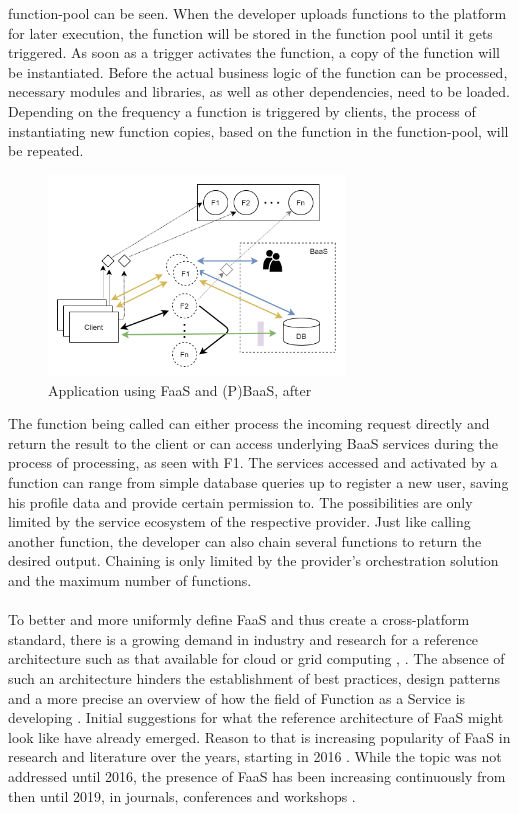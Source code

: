 \documentclass[a4paper,11pt, pagesize]{scrartcl}
\begin{document}
\begin{spacing}{1.2}
function-pool can be seen. When the developer uploads functions to the platform for later execution, the function will be stored in the function pool until it gets triggered. As soon as a trigger activates the function, a copy of the function will be instantiated. Before the actual business logic of the function can be processed, necessary modules and libraries, as well as other dependencies, need to be loaded. Depending on the frequency a function is triggered by clients, the process of instantiating new function copies, based on the function in the function-pool, will be repeated.\\
\begin{figure}[H]
\label{fig:FaaSBaaSExample}
\centering
\includegraphics[width=0.7\textwidth]{FaaS}
\caption{Application using FaaS and (P)BaaS, after \cite{shafiei2020serverless}}
\end{figure}
The function being called can either process the incoming request directly and return the result to the client or can access underlying BaaS services during the process of processing, as seen with F1. The services accessed and activated by a function can range from simple database queries up to register a new user, saving his profile data and provide certain permission to. The possibilities are only limited by the service ecosystem of the respective provider. Just like calling another function, the developer can also chain several functions to return the desired output. Chaining is only limited by the provider's orchestration solution and the maximum number of functions.\\\\ To better and more uniformly define FaaS and thus create a cross-platform standard, there is a growing demand in industry and research for a reference architecture such as that available for cloud or grid computing \cite{liu2011nist}, \cite{foster2003grid}. The absence of such an architecture hinders the establishment of best practices, design patterns and a more precise an overview of how the field of Function as a Service is developing \cite{leitner2019mixed}. Initial suggestions for what the reference architecture of FaaS might look like have already emerged. Reason to that is increasing popularity of FaaS in research and literature over the years, starting in 2016  \cite{van2019spec}. While the topic was not addressed until 2016, the presence of FaaS has been increasing continuously from then until 2019, in journals, conferences and workshops \cite{Yussupov2019_SystematicMappingStudyFaaS}.

\end{spacing}
\end{document}
